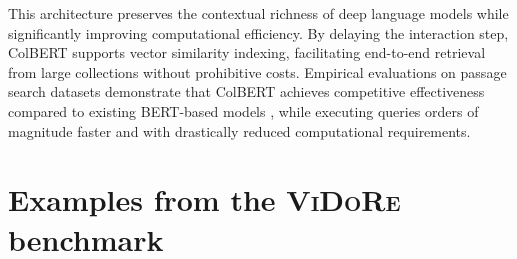 This architecture preserves the contextual richness of deep language models while significantly improving computational efficiency. By delaying the interaction step, ColBERT supports vector similarity indexing, facilitating end-to-end retrieval from large collections without prohibitive costs. Empirical evaluations on passage search datasets demonstrate that ColBERT achieves competitive effectiveness compared to existing BERT-based models , while executing queries orders of magnitude faster and with drastically reduced computational requirements.


\section{Examples from the \textsc{ViDoRe} benchmark}
\label{subsection:docvisbenchmark_examples}

